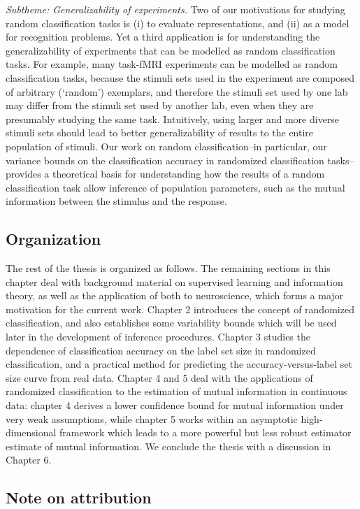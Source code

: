 \emph{Subtheme: Generalizability of experiments.} Two of our
motivations for studying random classification tasks is (i) to
evaluate representations, and (ii) as a model for recognition
problems.  Yet a third application is for understanding the
generalizability of experiments that can be modelled as random
classification tasks.  For example, many task-fMRI experiments can be
modelled as random classification tasks, because the stimuli sets used
in the experiment are composed of arbitrary (`random') exemplars, and
therefore the stimuli set used by one lab may differ from the stimuli
set used by another lab, even when they are presumably studying the
same task.  Intuitively, using larger and more diverse stimuli sets
should lead to better generalizability of results to the entire
population of stimuli.  Our work on random classification--in
particular, our variance bounds on the classification accuracy in
randomized classification tasks--provides a theoretical basis for
understanding how the results of a random classification task
allow inference of population parameters, such as the mutual
information between the stimulus and the response.

\subsection{Organization}

The rest of the thesis is organized as follows.  The remaining
sections in this chapter deal with background material on supervised
learning and information theory, as well as the application of both to
neuroscience, which forms a major motivation for the current work.
Chapter 2 introduces the concept of randomized classification, and
also establishes some variability bounds which will be used later in
the development of inference procedures.  Chapter 3 studies the
dependence of classification accuracy on the label set size in
randomized classification, and a practical method for predicting the
accuracy-versus-label set size curve from real data.  Chapter 4 and 5
deal with the applications of randomized classification to the
estimation of mutual information in continuous data: chapter 4 derives
a lower confidence bound for mutual information under very weak
assumptions, while chapter 5 works within an asymptotic
high-dimensional framework which leads to a more powerful but less
robust estimator estimate of mutual information.  We conclude the
thesis with a discussion in Chapter 6.


\subsection{Note on attribution}

